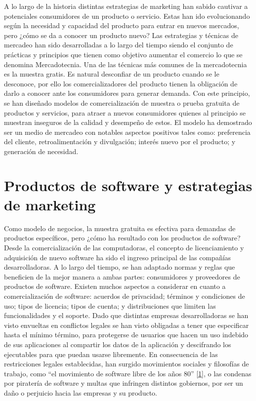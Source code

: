 \documentclass[12pt,spanish,Letterpaper,openany]{book}
\begin{document}
A lo largo de la historia distintas estrategias de marketing han sabido cautivar a potenciales consumidores de un producto o servicio. Estas han ido evolucionando según la necesidad y capacidad del producto para entrar en nuevos mercados, pero ¿cómo se da a conocer un producto nuevo? Las estrategias y técnicas de mercadeo han sido desarrolladas a lo largo del tiempo siendo el conjunto de prácticas y principios que tienen como objetivo aumentar el comercio lo que se denomina Mercadotecnia. Una de las técnicas más comunes de la mercadotecnia es la muestra gratis. Es natural desconfiar de un producto cuando se le desconoce, por ello los comercializadores del producto tienen la obligación de darlo a conocer ante los consumidores para generar demanda. Con este principio, se han diseñado modelos de comercialización de muestra o prueba gratuita de productos y servicios, para atraer a nuevos consumidores quienes al principio se muestran inseguros de la calidad y desempeño de estos. El modelo ha demostrado ser un medio de mercadeo con notables aspectos positivos tales como: preferencia del cliente, retroalimentación y divulgación; interés nuevo por el producto; y generación de necesidad.

\hypertarget{productos-de-software-y-estrategias-de-marketing}{%
\section{Productos de software y estrategias de marketing}\label{productos-de-software-y-estrategias-de-marketing}}

Como modelo de negocios, la muestra gratuita es efectiva para demandas de productos específicos, pero ¿cómo ha resultado con los productos de software? Desde la comercialización de las computadoras, el concepto de licenciamiento y adquisición de nuevo software ha sido el ingreso principal de las compañías desarrolladoras. A lo largo del tiempo, se han adaptado normas y reglas que beneficien de la mejor manera a ambas partes: consumidores y proveedores de productos de software. Existen muchos aspectos a considerar en cuanto a comercialización de software: acuerdos de privacidad; términos y condiciones de uso; tipos de licencia; tipos de cuenta; y distribuciones que limiten las funcionalidades y el soporte. Dado que distintas empresas desarrolladoras se han visto envueltas en conflictos legales se han visto obligadas a tener que especificar hasta el mínimo término, para protegerse de usuarios que hacen un uso indebido de sus aplicaciones al compartir los datos de la aplicación y descifrando los ejecutables para que puedan usarse libremente. En consecuencia de las restricciones legales establecidas, han surgido movimientos sociales y filosofías de trabajo, como ``el movimiento de software libre de los años 80'' \protect\hyperlink{articulo10_ref01}{{[}1{]}}, o las condenas por piratería de software y multas que infringen distintos gobiernos, por ser un daño o perjuicio hacia las empresas y su producto.
\end{document}
